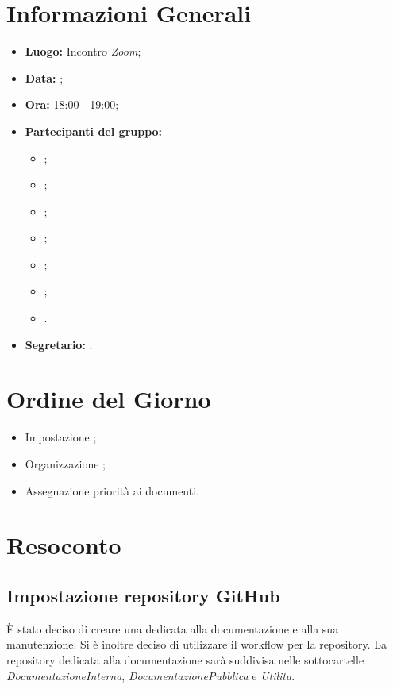 \section{Informazioni Generali}
\begin{itemize}
\item \textbf{Luogo:} Incontro \textit{Zoom};
\item \textbf{Data:} \Data;
\item \textbf{Ora:} 18:00 - 19:00;
\item \textbf{Partecipanti del gruppo:}
	\begin{itemize}
		\item \BL{}; 
		\item \FF{};
		\item \MM{}; 
		\item \PC{};
		\item \TG{};
		\item \TL{};
		\item \VD{}.
	\end{itemize} 
\item \textbf{Segretario:} \PC{}.
\end{itemize}

\section{Ordine del Giorno}
\begin{itemize}
 \item Impostazione  ;
 \item Organizzazione ;
 \item Assegnazione priorità ai documenti.
\end{itemize}

\section{Resoconto}
\subsection{Impostazione repository GitHub}
È stato deciso di creare una  dedicata alla documentazione e alla sua manutenzione. Si è inoltre deciso di utilizzare il workflow  per la repository. La repository dedicata alla documentazione sarà suddivisa nelle sottocartelle \textit{DocumentazioneInterna}, \textit{DocumentazionePubblica} e \textit{Utilita}.

